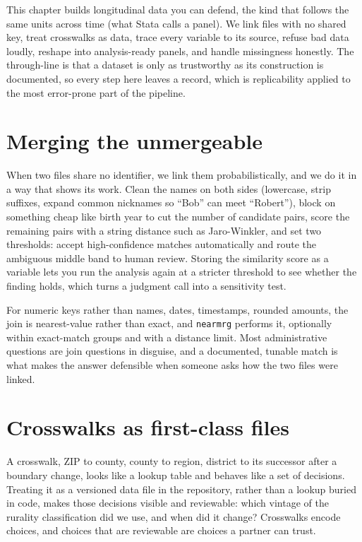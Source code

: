 \documentclass[
    a4paper,
    fontsize=10pt,
    twoside=true,
    numbers=noenddot,
]{kaobook}
\begin{document}
This chapter builds longitudinal data you can defend, the kind that follows the same units across time (what Stata calls a panel). We link files with no shared key, treat crosswalks as data, trace every variable to its source, refuse bad data loudly, reshape into analysis-ready panels, and handle missingness honestly. The through-line is that a dataset is only as trustworthy as its construction is documented, so every step here leaves a record, which is replicability applied to the most error-prone part of the pipeline.

\section{Merging the unmergeable}
When two files share no identifier, we link them probabilistically, and we do it in a way that shows its work. Clean the names on both sides (lowercase, strip suffixes, expand common nicknames so \enquote{Bob} can meet \enquote{Robert}), block on something cheap like birth year to cut the number of candidate pairs, score the remaining pairs with a string distance such as Jaro-Winkler, and set two thresholds: accept high-confidence matches automatically and route the ambiguous middle band to human review. Storing the similarity score as a variable lets you run the analysis again at a stricter threshold to see whether the finding holds, which turns a judgment call into a sensitivity test.

For numeric keys rather than names, dates, timestamps, rounded amounts, the join is nearest-value rather than exact, and \texttt{nearmrg} performs it, optionally within exact-match groups and with a distance limit. Most administrative questions are join questions in disguise, and a documented, tunable match is what makes the answer defensible when someone asks how the two files were linked.

\section{Crosswalks as first-class files}
A crosswalk, ZIP to county, county to region, district to its successor after a boundary change, looks like a lookup table and behaves like a set of decisions. Treating it as a versioned data file in the repository, rather than a lookup buried in code, makes those decisions visible and reviewable: which vintage of the rurality classification did we use, and when did it change? Crosswalks encode choices, and choices that are reviewable are choices a partner can trust.
\end{document}
